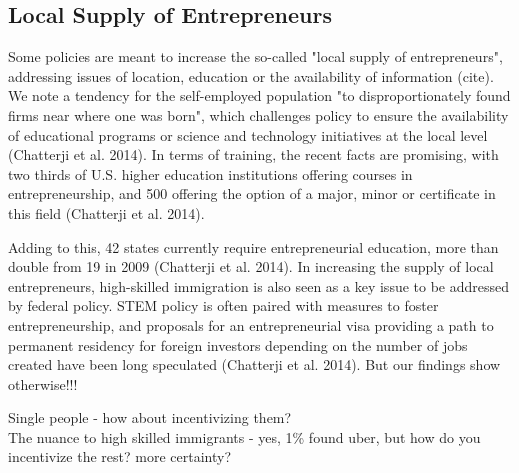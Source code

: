 \subsection{Local Supply of Entrepreneurs}

Some policies are meant to increase the so-called  "local supply of entrepreneurs", addressing issues of location, education or the availability of information (cite). We note a tendency for the self-employed population "to disproportionately found firms near where one was born", which challenges policy to ensure the availability of educational programs or science and technology initiatives at the local level (Chatterji et al. 2014). In terms of training, the recent facts are promising, with two thirds of U.S. higher education institutions offering courses in entrepreneurship, and 500 offering the option of a major, minor or certificate in this field (Chatterji et al. 2014). 

Adding to this, 42 states currently require entrepreneurial education, more than double from 19 in 2009 (Chatterji et al. 2014). In increasing the supply of local entrepreneurs, high-skilled immigration is also seen as a key issue to be addressed by federal policy. STEM policy is often paired with measures to foster entrepreneurship, and proposals for an entrepreneurial visa providing a path to permanent residency for foreign investors depending on the number of jobs created have been long speculated (Chatterji et al. 2014). But our findings show otherwise!!!
 


Single people - how about incentivizing them? \\
The nuance to high skilled immigrants - yes, 1\% found uber, but how do you incentivize the rest? more certainty? 
















